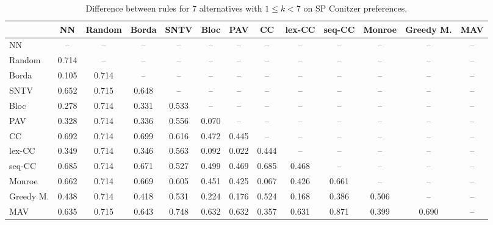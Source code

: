 
\begin{table*}[htbp]
\centering
\begin{tabular}{lcccccccccccc}
\toprule
 & NN & Random & Borda & SNTV & Bloc & PAV & CC & lex-CC & seq-CC & Monroe & Greedy M. & MAV \\
\midrule
NN & -- & -- & -- & -- & -- & -- & -- & -- & -- & -- & -- & -- \\
Random & \cellcolor{blue!71} 0.714 & -- & -- & -- & -- & -- & -- & -- & -- & -- & -- & -- \\
Borda & \cellcolor{blue!10} 0.105 & \cellcolor{blue!71} 0.714 & -- & -- & -- & -- & -- & -- & -- & -- & -- & -- \\
SNTV & \cellcolor{blue!65} 0.652 & \cellcolor{blue!71} 0.715 & \cellcolor{blue!64} 0.648 & -- & -- & -- & -- & -- & -- & -- & -- & -- \\
Bloc & \cellcolor{blue!27} 0.278 & \cellcolor{blue!71} 0.714 & \cellcolor{blue!33} 0.331 & \cellcolor{blue!53} 0.533 & -- & -- & -- & -- & -- & -- & -- & -- \\
PAV & \cellcolor{blue!32} 0.328 & \cellcolor{blue!71} 0.714 & \cellcolor{blue!33} 0.336 & \cellcolor{blue!55} 0.556 & \cellcolor{blue!7} 0.070 & -- & -- & -- & -- & -- & -- & -- \\
CC & \cellcolor{blue!69} 0.692 & \cellcolor{blue!71} 0.714 & \cellcolor{blue!69} 0.699 & \cellcolor{blue!61} 0.616 & \cellcolor{blue!47} 0.472 & \cellcolor{blue!44} 0.445 & -- & -- & -- & -- & -- & -- \\
lex-CC & \cellcolor{blue!34} 0.349 & \cellcolor{blue!71} 0.714 & \cellcolor{blue!34} 0.346 & \cellcolor{blue!56} 0.563 & \cellcolor{blue!9} 0.092 & \cellcolor{blue!2} 0.022 & \cellcolor{blue!44} 0.444 & -- & -- & -- & -- & -- \\
seq-CC & \cellcolor{blue!68} 0.685 & \cellcolor{blue!71} 0.714 & \cellcolor{blue!67} 0.671 & \cellcolor{blue!52} 0.527 & \cellcolor{blue!49} 0.499 & \cellcolor{blue!46} 0.469 & \cellcolor{blue!68} 0.685 & \cellcolor{blue!46} 0.468 & -- & -- & -- & -- \\
Monroe & \cellcolor{blue!66} 0.662 & \cellcolor{blue!71} 0.714 & \cellcolor{blue!66} 0.669 & \cellcolor{blue!60} 0.605 & \cellcolor{blue!45} 0.451 & \cellcolor{blue!42} 0.425 & \cellcolor{blue!6} 0.067 & \cellcolor{blue!42} 0.426 & \cellcolor{blue!66} 0.661 & -- & -- & -- \\
Greedy M. & \cellcolor{blue!43} 0.438 & \cellcolor{blue!71} 0.714 & \cellcolor{blue!41} 0.418 & \cellcolor{blue!53} 0.531 & \cellcolor{blue!22} 0.224 & \cellcolor{blue!17} 0.176 & \cellcolor{blue!52} 0.524 & \cellcolor{blue!16} 0.168 & \cellcolor{blue!38} 0.386 & \cellcolor{blue!50} 0.506 & -- & -- \\
MAV & \cellcolor{blue!63} 0.635 & \cellcolor{blue!71} 0.715 & \cellcolor{blue!64} 0.643 & \cellcolor{blue!74} 0.748 & \cellcolor{blue!63} 0.632 & \cellcolor{blue!63} 0.632 & \cellcolor{blue!35} 0.357 & \cellcolor{blue!63} 0.631 & \cellcolor{blue!87} 0.871 & \cellcolor{blue!39} 0.399 & \cellcolor{blue!69} 0.690 & -- \\
\bottomrule
\end{tabular}

\caption{Difference between rules for 7 alternatives with $1 \leq k < 7$ on SP Conitzer preferences.}
\label{tab:rule_distance_heatmap-m=[7]-pref_dist=single_peaked_conitzer}
\end{table*}
    